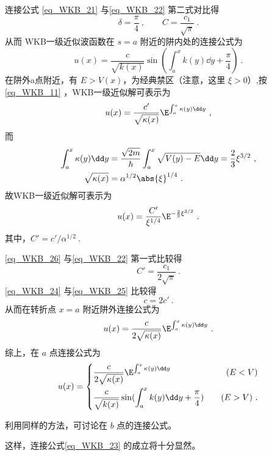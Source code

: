 \begin{example}{连接公式}
\autoref{eq_WKB_21} 与\autoref{eq_WKB_22} 第二式对比得
\begin{equation}\label{eq_WKB_25}
\delta=\frac{\pi}{4}~,\qquad C=\frac{c_1}{\sqrt{\pi}}~.
\end{equation}
从而 WKB一级近似波函数在 $s=a$ 附近的阱内处的连接公式为
\begin{equation}
u(x)=\frac{c}{\sqrt{k(x)}}\sin(\int_a^x k(y)\dd y+\frac{\pi}{4})~.
\end{equation}
在阱外a点附近，有 $E>V(x)$，为经典禁区（注意，这里 $\xi>0$）,按\autoref{eq_WKB_11} ，WKB一级近似解可表示为
\begin{equation}
u(x)=\frac{c'}{\sqrt{\kappa(x)}}\E^{\int_a^x\kappa(y)\dd y}~,
\end{equation}
而
\begin{equation}
\begin{aligned}
\int_a^x\kappa(y)\dd y&=
\frac{\sqrt{2m}}{\hbar}\int_a^x\sqrt{V(y)-E}\dd y=\frac{2}{3}\xi^{3/2}~,
\\
\sqrt{\kappa(x)}
&=
\alpha^{1/2}\abs{\xi}^{1/4}~.
\end{aligned}
\end{equation}
故WKB一级近似解可表示为
\begin{equation}\label{eq_WKB_26}
u(x)=\frac{C'}{\xi^{1/4}}\E^{-\frac{2}{3}\xi^{3/2}}~.
\end{equation}
其中，$C'=c'/\alpha^{1/2}~.$

\autoref{eq_WKB_26}  与\autoref{eq_WKB_22} 第一式比较得
\begin{equation}\label{eq_WKB_24}
C'=\frac{c_1}{2\sqrt{\pi}}~.
\end{equation}
\autoref{eq_WKB_24} 与\autoref{eq_WKB_25} 比较得
\begin{equation}
c=2c'~.
\end{equation}
从而在转折点 $x=a$ 附近阱外连接公式为
\begin{equation}
u(x)=\frac{c}{2\sqrt{\kappa(x)}}\E^{\int_a^x\kappa(y)\dd y}~.
\end{equation}
综上，在 $a$ 点连接公式为
\begin{equation}
u(x)=\left\{\begin{aligned}
&\frac{c}{2\sqrt{\kappa(x)}}\E^{\int_a^x\kappa(y)\dd y} &\quad(E<V)\\
&\frac{c}{\sqrt{k(x)}}\sin(\int_a^x k(y)\dd y+\frac{\pi}{4})&\quad(E>V)~.
\end{aligned}\right.
\end{equation}

利用同样的方法，可讨论在 $b$ 点的连接公式。
\end{example}

这样，连接公式\autoref{eq_WKB_23} 的成立将十分显然。

